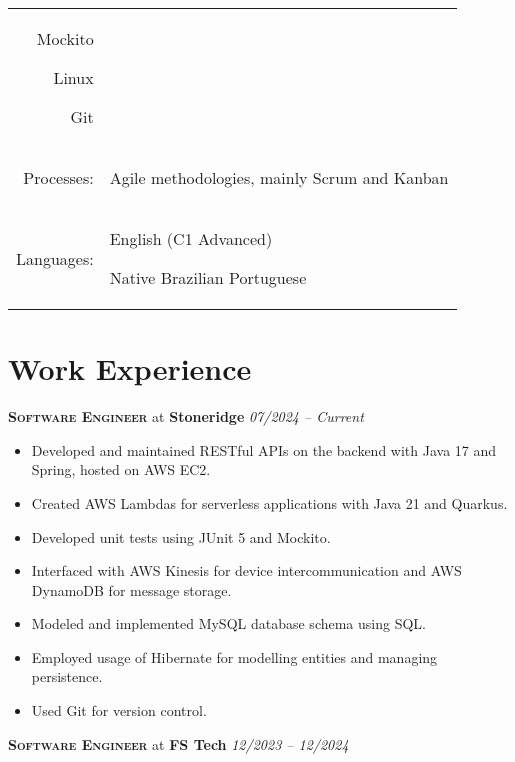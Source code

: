 \documentclass[a4paper,12pt]{article}
\begin{document}
\begin{tabular}{rp{15.2cm}}
\begin{itemize*}[label=\Large\textbullet]
    \item Mockito
    \item Linux
    \item Git
\end{itemize*}\\
\raggedleft Processes:
& \begin{itemize*}[label=\Large\textbullet]
    \item Agile methodologies, mainly Scrum and Kanban
\end{itemize*}\\
\raggedleft Languages:
& \begin{itemize*}[label=\Large\textbullet]
    \item English (C1 Advanced)
    \item Native Brazilian Portuguese
\end{itemize*}\\
\end{tabular}

\section{Work Experience}

\vspace{8pt}

\textbf{\textsc{Software Engineer}} at \textbf{Stoneridge} \hfill \textit{07/2024 -- Current}

{\small
\begin{itemize}[leftmargin=*,label=\large\textbullet]
    \setlength\itemsep{-0.2em}
    \item Developed and maintained RESTful APIs on the backend with Java 17 and Spring, hosted on AWS EC2.
    \item Created AWS Lambdas for serverless applications with Java 21 and Quarkus.
    \item Developed unit tests using JUnit 5 and Mockito.
    \item Interfaced with AWS Kinesis for device intercommunication and AWS DynamoDB for message storage.
    \item Modeled and implemented MySQL database schema using SQL.
    \item Employed usage of Hibernate for modelling entities and managing persistence.
    \item Used Git for version control.
\end{itemize}
}

\textbf{\textsc{Software Engineer}} at \textbf{FS Tech} \hfill \textit{12/2023 -- 12/2024}
\end{document}
